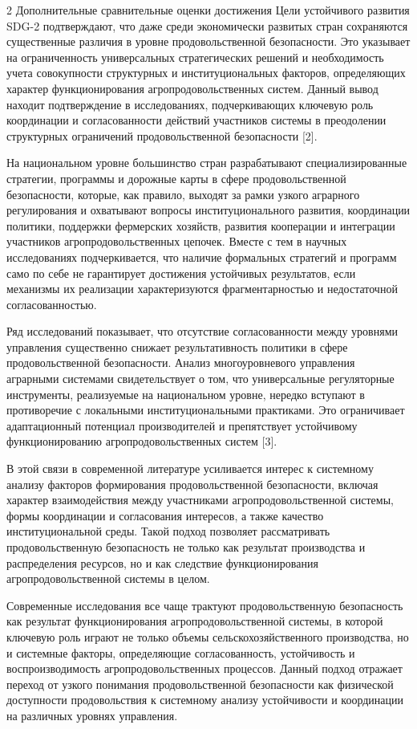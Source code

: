 \begin{multicols}{2}
Дополнительные сравнительные оценки достижения Цели устойчивого развития
SDG-2 подтверждают, что даже среди экономически развитых стран
сохраняются существенные различия в уровне продовольственной
безопасности. Это указывает на ограниченность универсальных
стратегических решений и необходимость учета совокупности структурных и
институциональных факторов, определяющих характер функционирования
агропродовольственных систем. Данный вывод находит подтверждение в
исследованиях, подчеркивающих ключевую роль координации и
согласованности действий участников системы в преодолении структурных
ограничений продовольственной безопасности {[}2{]}.

На национальном уровне большинство стран разрабатывают
специализированные стратегии, программы и дорожные карты в сфере
продовольственной безопасности, которые, как правило, выходят за рамки
узкого аграрного регулирования и охватывают вопросы институционального
развития, координации политики, поддержки фермерских хозяйств, развития
кооперации и интеграции участников агропродовольственных цепочек. Вместе
с тем в научных исследованиях подчеркивается, что наличие формальных
стратегий и программ само по себе не гарантирует достижения устойчивых
результатов, если механизмы их реализации характеризуются
фрагментарностью и недостаточной согласованностью.

Ряд исследований показывает, что отсутствие согласованности между
уровнями управления существенно снижает результативность политики в
сфере продовольственной безопасности. Анализ многоуровневого управления
аграрными системами свидетельствует о том, что универсальные
регуляторные инструменты, реализуемые на национальном уровне, нередко
вступают в противоречие с локальными институциональными практиками. Это
ограничивает адаптационный потенциал производителей и препятствует
устойчивому функционированию агропродовольственных систем {[}3{]}.

В этой связи в современной литературе усиливается интерес к системному
анализу факторов формирования продовольственной безопасности, включая
характер взаимодействия между участниками агропродовольственной системы,
формы координации и согласования интересов, а также качество
институциональной среды. Такой подход позволяет рассматривать
продовольственную безопасность не только как результат производства и
распределения ресурсов, но и как следствие функционирования
агропродовольственной системы в целом.

Современные исследования все чаще трактуют продовольственную
безопасность как результат функционирования агропродовольственной
системы, в которой ключевую роль играют не только объемы
сельскохозяйственного производства, но и системные факторы, определяющие
согласованность, устойчивость и воспроизводимость агропродовольственных
процессов. Данный подход отражает переход от узкого понимания
продовольственной безопасности как физической доступности продовольствия
к системному анализу устойчивости и координации на различных уровнях
управления.


\end{multicols}
